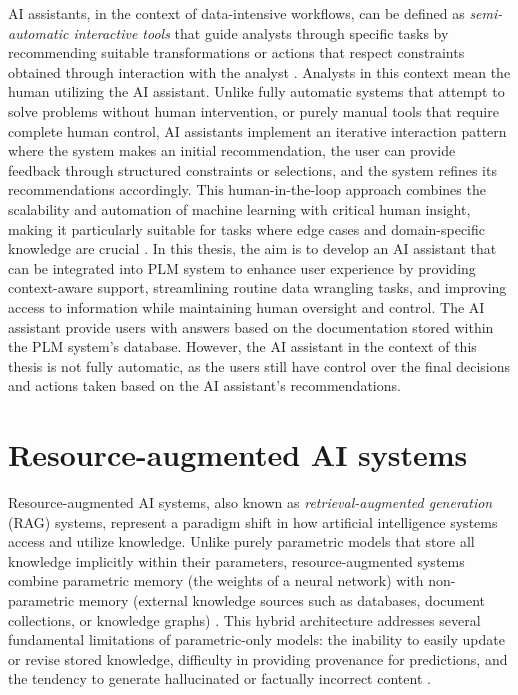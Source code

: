 AI assistants, in the context of data-intensive workflows, can be defined as \textit{semi-automatic interactive tools} that guide analysts through specific tasks by recommending suitable transformations or actions that respect constraints obtained through interaction with the analyst \parencite{petricek_ai_2023}. Analysts in this context mean the human utilizing the AI assistant. Unlike fully automatic systems that attempt to solve problems without human intervention, or purely manual tools that require complete human control, AI assistants implement an iterative interaction pattern where the system makes an initial recommendation, the user can provide feedback through structured constraints or selections, and the system refines its recommendations accordingly. This human-in-the-loop approach combines the scalability and automation of machine learning with critical human insight, making it particularly suitable for tasks where edge cases and domain-specific knowledge are crucial \parencite{petricek_ai_2023}. In this thesis, the aim is to develop an AI assistant that can be integrated into PLM system to enhance user experience by providing context-aware support, streamlining routine data wrangling tasks, and improving access to information while maintaining human oversight and control. The AI assistant provide users with answers based on the documentation stored within the PLM system's database. However, the AI assistant in the context of this thesis is not fully automatic, as the users still have control over the final decisions and actions taken based on the AI assistant's recommendations.

\section{Resource-augmented AI systems}
\label{sec:resource-augmented-ai-systems}

Resource-augmented AI systems, also known as \emph{retrieval-augmented generation} (RAG) systems, represent a paradigm shift in how artificial intelligence systems access and utilize knowledge. Unlike purely parametric models that store all knowledge implicitly within their parameters, resource-augmented systems combine parametric memory (the weights of a neural network) with non-parametric memory (external knowledge sources such as databases, document collections, or knowledge graphs) \parencite{lewis_retrieval-augmented_2021}. This hybrid architecture addresses several fundamental limitations of parametric-only models: the inability to easily update or revise stored knowledge, difficulty in providing provenance for predictions, and the tendency to generate hallucinated or factually incorrect content \parencite{lewis_retrieval-augmented_2021}.

